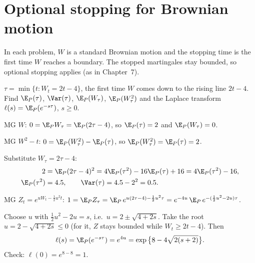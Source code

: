 \section{Optional stopping for Brownian motion}

In each problem, $W$ is a standard Brownian motion and the stopping time is the first time $W$ reaches a boundary. The stopped martingales stay bounded, so optional stopping applies (as in Chapter~7).

\begin{problem}
\label{ex:p-rising}
$\tau=\min\{t:W_t=2t-4\}$, the first time $W$ comes down to the rising line $2t-4$. Find $\E_P(\tau)$, $\Var(\tau)$, $\E_P(W_\tau)$, $\E_P(W_\tau^2)$ and the Laplace transform $\ell(s)=\E_P(e^{-s\tau})$, $s\ge0$.
\begin{steps}
  \item MG $W$: $0=\E_PW_\tau=\E_P(2\tau-4)$, so $\E_P(\tau)=2$ and $\E_P(W_\tau)=0$.
  \item MG $W^2-t$: $0=\E_P(W_\tau^2)-\E_P(\tau)$, so $\E_P(W_\tau^2)=\E_P(\tau)=2$.
  \item Substitute $W_\tau=2\tau-4$:
  \[
    \begin{aligned}
    2&=\E_P(2\tau-4)^2=4\E_P(\tau^2)-16\E_P(\tau)+16=4\E_P(\tau^2)-16,\\
    \E_P(\tau^2)&=4.5,\qquad\Var(\tau)=4.5-2^2=0.5 .
    \end{aligned}
  \]
  \item MG $Z_t=e^{uW_t-\frac12u^2t}$: $1=\E_PZ_\tau=\E_P\,e^{u(2\tau-4)-\frac12u^2\tau}=e^{-4u}\,\E_P\,e^{-(\frac12u^2-2u)\tau}$.
  \item Choose $u$ with $\frac12u^2-2u=s$, i.e.\ $u=2\pm\sqrt{4+2s}$. Take the root $u=2-\sqrt{4+2s}\le0$ (for it, $Z$ stays bounded while $W_t\ge2t-4$). Then
  \[
    \ell(s)=\E_P(e^{-s\tau})=e^{4u}=\exp\big\{8-4\sqrt{2(s+2)}\big\}.
  \]
  Check: $\ell(0)=e^{8-8}=1$.
\end{steps}
\end{problem}

\begin{pic}
\end{pic}

